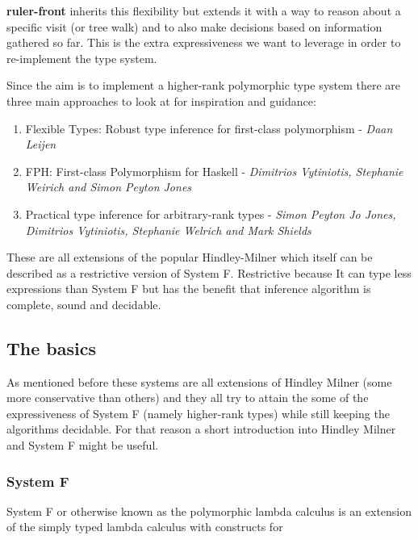 \documentclass[12pt, a4paper, oneside]{article}
\begin{document}
\textbf{ruler-front} inherits this flexibility but extends it with a way to reason about a specific visit (or tree walk) and to also make decisions based on information gathered so far. This is the extra expressiveness we want to leverage in order to re-implement the type system.

Since the aim is to implement a higher-rank polymorphic type system there are three main approaches to look at for inspiration and guidance:

\begin{enumerate}
\item Flexible Types: Robust type inference for first-class polymorphism - \textit{Daan Leijen}
\item FPH: First-class Polymorphism for Haskell - \textit{Dimitrios Vytiniotis, Stephanie Weirich and Simon Peyton Jones}
\item Practical type inference for arbitrary-rank types - \textit{Simon Peyton Jo Jones, Dimitrios Vytiniotis, Stephanie Welrich and Mark Shields}
\end{enumerate}

These are all extensions of the popular Hindley-Milner which itself can be described as a restrictive version of System F. Restrictive because It can type less expressions than System F but has the benefit that inference algorithm is complete, sound and decidable.

\subsection{The basics}
As mentioned before these systems are all extensions of Hindley Milner (some more conservative than others) and they all try to attain the some of the expressiveness of System F (namely higher-rank types) while still keeping the algorithms decidable. For that reason a short introduction into Hindley Milner and System F might be useful.

\subsubsection{System F}
System F or otherwise known as the polymorphic lambda calculus is an extension of the simply typed lambda calculus with constructs for
\end{document}
